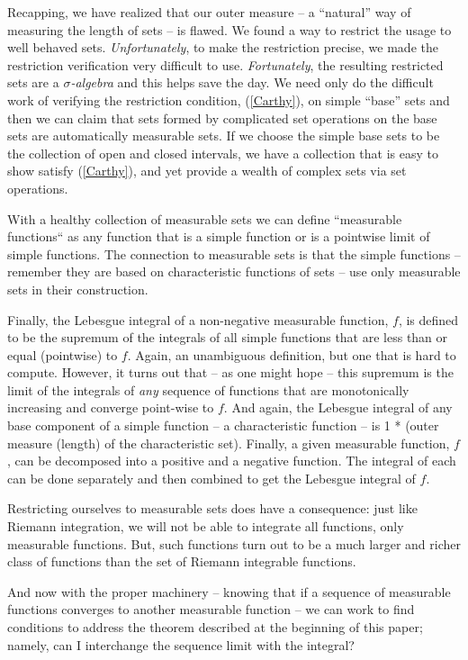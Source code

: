 \documentclass{article}
\begin{document}
Recapping, we have realized that our outer measure -- a ``natural'' way of 
measuring the length of sets -- is flawed. We found a way to restrict the 
usage to well behaved sets. {\em Unfortunately\/}, to make the restriction precise, 
we made the restriction verification very difficult to use. {\em Fortunately\/}, 
the resulting restricted sets are a {\em $\sigma$-algebra\/} and this helps 
save the day. We need only do the difficult work of verifying the restriction 
condition, (\ref{Carthy}), on simple ``base'' sets and then we can claim that 
sets formed by complicated set operations on the base sets are automatically 
measurable sets. If we choose the simple base sets 
to be the collection of open and closed intervals, we have a collection that 
is easy to show satisfy (\ref{Carthy}), and yet provide a wealth of complex sets
via set operations.

With a healthy collection of measurable sets we can define ``measurable functions``
as any function that is a simple function or is a pointwise limit of simple functions.
The connection to measurable sets is that the simple functions -- remember they 
are based on characteristic functions of sets -- use only measurable sets in 
their construction.

Finally, the Lebesgue integral of a non-negative measurable function, $f$, is defined to be 
the supremum of the integrals of
all simple functions that are less than or equal (pointwise) to $f$. 
Again, an unambiguous definition, but one that is hard to compute. 
However, it turns out that -- as one might hope --
this supremum is the limit of the integrals of {\em any\/} sequence of 
functions that are monotonically increasing and converge point-wise to $f$.
And again, the Lebesgue
integral of any base component of a simple function -- a characteristic function --
is 1 * (outer measure (length) of the characteristic set).
Finally, a given measurable function, $f$, can be decomposed into a positive and
a negative function. The integral of each can be done separately and then combined
to get the Lebesgue integral of $f$.

Restricting ourselves to measurable sets does have a consequence: just like 
Riemann integration, we will not be able to integrate all functions, only 
measurable functions. But, such functions turn out to be a 
much larger and richer class of functions than the set of Riemann integrable functions.

And now with the proper machinery -- knowing that if a sequence of measurable functions
converges to another measurable function -- we can work to find conditions
to address the theorem described at the beginning of this paper; namely, 
can I interchange the sequence limit with the integral?
\end{document}
